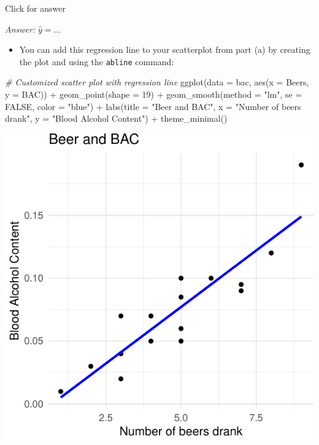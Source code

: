\documentclass[
]{book}
\newenvironment{Shaded}{\begin{snugshade}}{\end{snugshade}}
\newcommand{\AttributeTok}[1]{\textcolor[rgb]{0.77,0.63,0.00}{#1}}
\newcommand{\CommentTok}[1]{\textcolor[rgb]{0.56,0.35,0.01}{\textit{#1}}}
\newcommand{\ConstantTok}[1]{\textcolor[rgb]{0.00,0.00,0.00}{#1}}
\newcommand{\DecValTok}[1]{\textcolor[rgb]{0.00,0.00,0.81}{#1}}
\newcommand{\FunctionTok}[1]{\textcolor[rgb]{0.00,0.00,0.00}{#1}}
\newcommand{\NormalTok}[1]{#1}
\newcommand{\SpecialCharTok}[1]{\textcolor[rgb]{0.00,0.00,0.00}{#1}}
\newcommand{\StringTok}[1]{\textcolor[rgb]{0.31,0.60,0.02}{#1}}
\providecommand{\tightlist}{%
  \setlength{\itemsep}{0pt}\setlength{\parskip}{0pt}}
\begin{document}
Click for answer

\emph{Answer:} \(\hat{y} = \ldots\)

\begin{itemize}
\tightlist
\item
  You can add this regression line to your scatterplot from part (a) by creating the plot and using the \texttt{abline} command:
\end{itemize}

\begin{Shaded}
\begin{Highlighting}[]
\CommentTok{\# Customized scatter plot with regression line}
\FunctionTok{ggplot}\NormalTok{(}\AttributeTok{data =}\NormalTok{ bac, }\FunctionTok{aes}\NormalTok{(}\AttributeTok{x =}\NormalTok{ Beers, }\AttributeTok{y =}\NormalTok{ BAC)) }\SpecialCharTok{+} 
     \FunctionTok{geom\_point}\NormalTok{(}\AttributeTok{shape =} \DecValTok{19}\NormalTok{) }\SpecialCharTok{+}
     \FunctionTok{geom\_smooth}\NormalTok{(}\AttributeTok{method =} \StringTok{"lm"}\NormalTok{, }\AttributeTok{se =} \ConstantTok{FALSE}\NormalTok{, }\AttributeTok{color =} \StringTok{"blue"}\NormalTok{) }\SpecialCharTok{+}
     \FunctionTok{labs}\NormalTok{(}\AttributeTok{title =} \StringTok{"Beer and BAC"}\NormalTok{,}
          \AttributeTok{x =} \StringTok{"Number of beers drank"}\NormalTok{,}
          \AttributeTok{y =} \StringTok{"Blood Alcohol Content"}\NormalTok{) }\SpecialCharTok{+}
     \FunctionTok{theme\_minimal}\NormalTok{()}
\end{Highlighting}
\end{Shaded}

\includegraphics[width=1\linewidth]{Class_Activity_6_files/figure-latex/unnamed-chunk-7-1}
\end{document}
